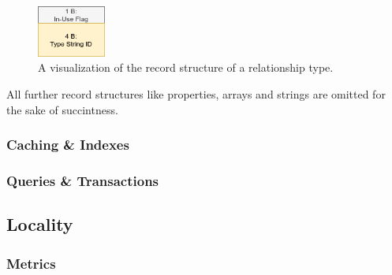                 \begin{figure}[htp]\label{rel_type_record}
                    \begin{center}
                        \includegraphics[keepaspectratio,height=0.2\textheight,width=0.2\textwidth]{img/03_record/relationship/rel_type_record.png}
                    \end{center}
                    \caption{A visualization of the record structure of a relationship type.} %
                \end{figure}
                
           
           All further record structures like properties, arrays and strings are omitted for the sake of succintness.
        
        \subsubsection{Caching \& Indexes} 
        
        \subsubsection{Queries \& Transactions}
            
            
    \subsection{Locality}\label{\positionnumber}
        
        \subsubsection{Metrics}
    



